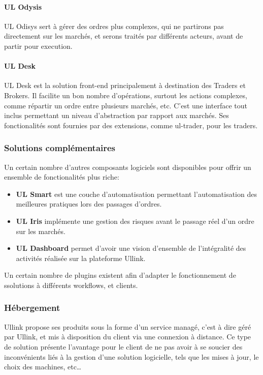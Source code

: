 \documentclass[a4paper, 12pt]{article}
\begin{document}
\paragraph{UL Odysis}

UL Odisys sert à gérer des ordres plus complexes, qui ne partirons pas directement sur les marchés, et serons traités par différents acteurs, avant de partir pour execution.

\paragraph{UL Desk}
UL Desk est la solution front-end principalement à destination des Traders et Brokers. Il facilite un bon nombre d'opérations, surtout les actions complexes, comme répartir un ordre entre plusieurs marchés, etc. C'est une interface tout inclus permettant un niveau d'abstraction par rapport aux marchés. Ses fonctionalités sont fournies par des extensions, comme ul-trader, pour les traders.

\subsubsection{Solutions complémentaires}
Un certain nombre d'autres composants logiciels sont disponibles pour offrir un ensemble de fonctionalités plus riche:

\begin{itemize}
\item{{\bf UL Smart} est une couche d'automatisation permettant l'automatisation des meilleures pratiques lors des passages d'ordres.}
\item{{\bf UL Iris} implémente une gestion des risques avant le passage réel d'un ordre sur les marchés.}
\item{{\bf UL Dashboard} permet d'avoir une vision d'ensemble de l'intégralité des activités réalisée sur la plateforme Ullink.}
\end{itemize}

Un certain nombre de plugins existent afin d'adapter le fonctionnement de ssolutions à différents workflows, et clients.

\subsubsection{Hébergement}

Ullink propose ses produits sous la forme d'un service managé, c'est à dire géré par Ullink, et mis à disposition du client via une connexion à distance. Ce type de solution présente l'avantage pour le client de ne pas avoir à se soucier des inconvénients liés à la gestion d'une solution logicielle, tels que les mises à jour, le choix des machines, etc\dots
\end{document}
